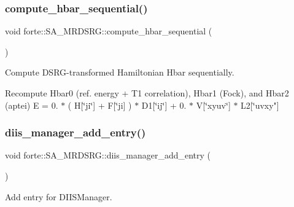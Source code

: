 \subsubsection{\texorpdfstring{compute\+\_\+hbar\+\_\+sequential()}{compute\_hbar\_sequential()}}
{\footnotesize\ttfamily void forte\+::\+S\+A\+\_\+\+M\+R\+D\+S\+R\+G\+::compute\+\_\+hbar\+\_\+sequential (\begin{DoxyParamCaption}{ }\end{DoxyParamCaption})\hspace{0.3cm}{\ttfamily [protected]}}



Compute D\+S\+R\+G-\/transformed Hamiltonian Hbar sequentially. 

Recompute Hbar0 (ref. energy + T1 correlation), Hbar1 (Fock), and Hbar2 (aptei) E = 0. $\ast$ ( H\mbox{[}\char`\"{}ji\char`\"{}\mbox{]} + F\mbox{[}\char`\"{}ji\mbox{]} ) $\ast$ D1\mbox{[}\char`\"{}ij\char`\"{}\mbox{]} + 0. $\ast$ V\mbox{[}\char`\"{}xyuv\char`\"{}\mbox{]} $\ast$ L2\mbox{[}\char`\"{}uvxy"\mbox{]} \mbox{\label{classforte_1_1_s_a___m_r_d_s_r_g_ac05ae5a470ad387b2a2f342fab7947b4}} 
\subsubsection{\texorpdfstring{diis\+\_\+manager\+\_\+add\+\_\+entry()}{diis\_manager\_add\_entry()}}
{\footnotesize\ttfamily void forte\+::\+S\+A\+\_\+\+M\+R\+D\+S\+R\+G\+::diis\+\_\+manager\+\_\+add\+\_\+entry (\begin{DoxyParamCaption}{ }\end{DoxyParamCaption})\hspace{0.3cm}{\ttfamily [protected]}}



Add entry for D\+I\+I\+S\+Manager. 

\mbox{\label{classforte_1_1_s_a___m_r_d_s_r_g_adc0babbfa353c9a791b57c93a940016e}} 

